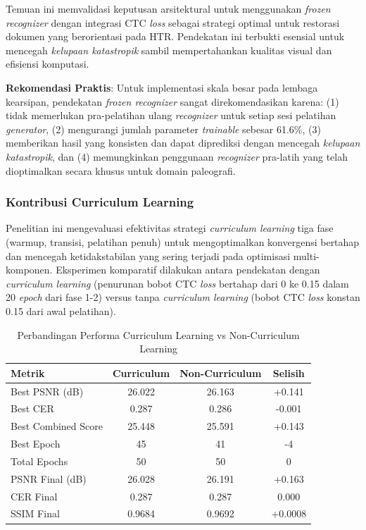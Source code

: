 \documentclass[12pt,a4paper]{article}
\begin{document}
Temuan ini memvalidasi keputusan arsitektural untuk menggunakan \textit{frozen recognizer} dengan integrasi CTC \textit{loss} sebagai strategi optimal untuk restorasi dokumen yang berorientasi pada HTR. Pendekatan ini terbukti esensial untuk mencegah \textit{kelupaan katastropik} sambil mempertahankan kualitas visual dan efisiensi komputasi.

\textbf{Rekomendasi Praktis}: Untuk implementasi skala besar pada lembaga kearsipan, pendekatan \textit{frozen recognizer} sangat direkomendasikan karena: (1) tidak memerlukan pra-pelatihan ulang \textit{recognizer} untuk setiap sesi pelatihan \textit{generator}, (2) mengurangi jumlah parameter \textit{trainable} sebesar 61.6\%, (3) memberikan hasil yang konsisten dan dapat diprediksi dengan mencegah \textit{kelupaan katastropik}, dan (4) memungkinkan penggunaan \textit{recognizer} pra-latih yang telah dioptimalkan secara khusus untuk domain paleografi.

\vspace{0.8em}

\subsubsection{Kontribusi Curriculum Learning}
\label{subsubsec:kontribusi-curriculum-learning}

Penelitian ini mengevaluasi efektivitas strategi \textit{curriculum learning} tiga fase (warmup, transisi, pelatihan penuh) untuk mengoptimalkan konvergensi bertahap dan mencegah ketidakstabilan yang sering terjadi pada optimisasi multi-komponen. Eksperimen komparatif dilakukan antara pendekatan dengan \textit{curriculum learning} (penurunan bobot CTC \textit{loss} bertahap dari 0 ke 0.15 dalam 20 \textit{epoch} dari fase 1-2) versus tanpa \textit{curriculum learning} (bobot CTC \textit{loss} konstan 0.15 dari awal pelatihan).

\begin{table}[H]
\centering
\caption{Perbandingan Performa Curriculum Learning vs Non-Curriculum Learning}
\label{tab:curriculum-comparison}
\begin{tabular}{lccc}
\toprule
\textbf{Metrik} & \textbf{Curriculum} & \textbf{Non-Curriculum} & \textbf{Selisih} \\
\midrule
Best PSNR (dB) & 26.022 & 26.163 & +0.141 \\
Best CER & 0.287 & 0.286 & -0.001 \\
Best Combined Score & 25.448 & 25.591 & +0.143 \\
Best Epoch & 45 & 41 & -4 \\
Total Epochs & 50 & 50 & 0 \\
\midrule
PSNR Final (dB) & 26.028 & 26.191 & +0.163 \\
CER Final & 0.287 & 0.287 & 0.000 \\
SSIM Final & 0.9684 & 0.9692 & +0.0008 \\
\bottomrule
\end{tabular}
\end{table}
\end{document}
